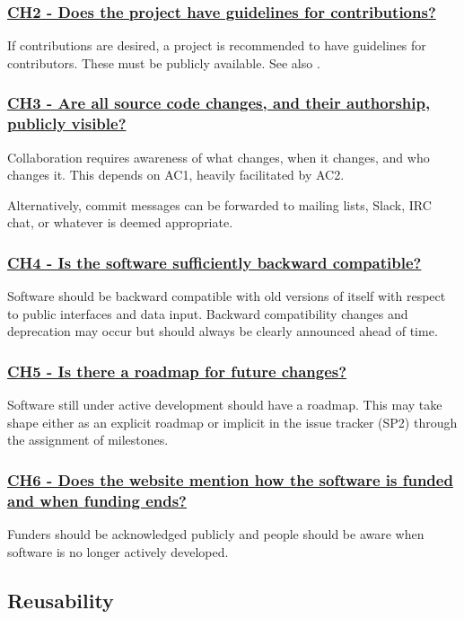 \documentclass[a4paper,11pt]{article}
\newcommand{\criterion}[2]{\subsubsection*{\underline{#1 - #2}}\label{id:#1}}
\newcommand\CheckTable{%
  \begin{tabular}{ccccc}
    No & Minimal & Adequate & Good & Perfect \\
    0 & 1 & 2 & 3 & 4 \\
    \hline
    $\square$ & $\square$ & $\square$ & $\square$ & $\square$ \\
  \end{tabular}%
}
\newcommand{\refcrit}[1]{%
 \framebox[1.1\width]{\hyperref[id:#1]{#1}}
}
\begin{document}

\newcommand{\chTwoID}{CH2}
\newcommand{\chTwoText}{Does the project have guidelines for contributions?}
\criterion{\chTwoID}{\chTwoText}

If contributions are desired, a project is recommended to have guidelines for
contributors. These must be publicly available.
See also \refcrit{AN8}.


\newcommand{\chThreeID}{CH3}
\newcommand{\chThreeText}{Are all source code changes, and their authorship, publicly visible?}
\criterion{\chThreeID}{\chThreeText}

Collaboration requires awareness of what changes, when it changes, and who
changes it. This depends on AC1, heavily facilitated by AC2.

Alternatively, commit messages can be forwarded to mailing lists, Slack, IRC chat, or
whatever is deemed appropriate.


\newcommand{\chFourID}{CH4}
\newcommand{\chFourText}{Is the software sufficiently backward compatible?}
\criterion{\chFourID}{\chFourText}

Software should be backward compatible with old versions of itself with respect
to public interfaces and data input. Backward compatibility changes and
deprecation may occur but should always be clearly announced ahead of time.


\newcommand{\chFiveID}{CH5}
\newcommand{\chFiveText}{Is there a roadmap for future changes?}
\criterion{\chFiveID}{\chFiveText}

Software still under active development should have a roadmap. This may take
shape either as an explicit roadmap or implicit in the issue tracker
(SP2) through the assignment of milestones.


\newcommand{\chSixID}{CH6}
\newcommand{\chSixText}{Does the website mention how the software is funded and when funding ends?}
\criterion{\chSixID}{\chSixText}

Funders should be acknowledged publicly and people should be aware when
software is no longer actively developed.


\subsection{Reusability}\label{sec:reu}
\end{document}

